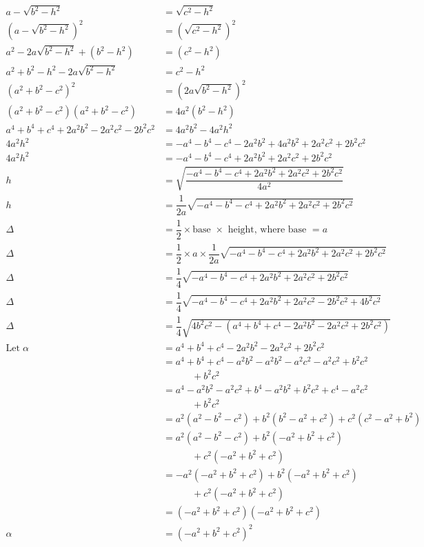 \documentclass[
]{book}
\begin{document}
\[
\begin{aligned}
a - \sqrt{b^2 - h^2} &= \sqrt{c^2 - h^2} \\
(a - \sqrt{b^2 - h^2})^2 &= (\sqrt{c^2 - h^2})^2 \\
a^2 - 2a\sqrt{b^2 - h^2} + (b^2 - h^2) &= (c^2 - h^2) \\
a^2 + b^2 - h^2 - 2a\sqrt{b^2 - h^2} &= c^2 - h^2 \\
(a^2 + b^2 - c^2)^2 &= (2a\sqrt{b^2 - h^2})^2 \\
(a^2 + b^2 - c^2)(a^2 + b^2 - c^2) &= 4a^2(b^2 - h^2) \\
a^4 + b^4 + c^4 + 2a^2b^2 - 2a^2c^2 - 2b^2c^2 &= 4a^2b^2 - 4a^2h^2 \\
4a^2h^2 &= -a^4 - b^4 - c^4 - 2a^2b^2 + 4a^2b^2 + 2a^2c^2 + 2b^2c^2 \\
4a^2h^2 &= -a^4 - b^4 - c^4 + 2a^2b^2 + 2a^2c^2 + 2b^2c^2 \\
h &= \sqrt{\dfrac{-a^4 - b^4 - c^4 + 2a^2b^2 + 2a^2c^2 + 2b^2c^2}{4a^2}} \\
h &= \dfrac{1}{2a} \sqrt{-a^4 - b^4 - c^4 + 2a^2b^2 + 2a^2c^2 + 2b^2c^2} \\
\Delta &= \dfrac{1}{2} \times \text{base $\times$ height, where base $= a$} \\
\Delta &= \dfrac{1}{2} \times a \times \dfrac{1}{2a} \sqrt{-a^4 - b^4 - c^4 + 2a^2b^2 + 2a^2c^2 + 2b^2c^2} \\
\Delta &= \dfrac{1}{4} \sqrt{-a^4 - b^4 - c^4 + 2a^2b^2 + 2a^2c^2 + 2b^2c^2} \\
\Delta &= \dfrac{1}{4} \sqrt{-a^4 - b^4 - c^4 + 2a^2b^2 + 2a^2c^2 - 2b^2c^2 + 4b^2c^2} \\
\Delta &= \dfrac{1}{4} \sqrt{4b^2c^2 - (a^4 + b^4 + c^4 - 2a^2b^2 - 2a^2c^2 + 2b^2c^2)} \\
\text{Let}\; \alpha &= a^4 + b^4 + c^4 - 2a^2b^2 - 2a^2c^2 + 2b^2c^2 \\
&= a^4 + b^4 + c^4 - a^2b^2 - a^2b^2 - a^2c^2 - a^2c^2 + b^2c^2 \\
    &\qquad\quad + b^2c^2 \\
&= a^4 - a^2b^2 - a^2c^2 + b^4 - a^2b^2 + b^2c^2 + c^4 - a^2c^2 \\
    &\qquad\quad + b^2c^2 \\
&= a^2(a^2 - b^2 - c^2) + b^2(b^2 - a^2 + c^2) + c^2(c^2 - a^2 + b^2) \\
&= a^2(a^2 - b^2 - c^2) + b^2(-a^2 + b^2 + c^2) \\
        &\qquad\quad + c^2(-a^2 + b^2 + c^2) \\
&= -a^2(-a^2 + b^2 + c^2) + b^2(-a^2 + b^2 + c^2) \\
        &\qquad\quad + c^2(-a^2 + b^2 + c^2) \\
&= (-a^2 + b^2 + c^2)(-a^2 + b^2 + c^2) \\
\alpha &= (-a^2 + b^2 + c^2)^2
\end{aligned}
\]
\end{document}
